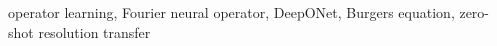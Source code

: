 operator learning, Fourier neural operator, DeepONet, Burgers equation, zero-shot resolution transfer
